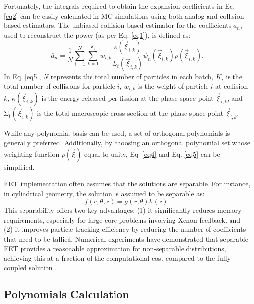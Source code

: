 Fortunately, the integrals required to obtain the expansion coefficients in Eq. \ref{eq2} can be easily calculated in MC simulations using both analog and collision-based estimators. The unbiased collision-based estimator for the coefficients ${\bar{a}}_n$, used to reconstruct the power (as per Eq. \ref{eq1}), is defined as:
\begin{equation}
    {\bar{a}}_n=\frac{1}{N}\sum_{i=1}^{N}{\sum_{k=1}^{K_i}{w_{i,k}\frac{\kappa\left({\vec{\xi}}_{i,k}\right)}{\Sigma_t\left({\vec{\xi}}_{i,k}\right)}}\psi_n\left({\vec{\xi}}_{i,k}\right)\rho\left({\vec{\xi}}_{i,k}\right)}.
    \label{eq5}
\end{equation}
In Eq. \ref{eq5}, $N$ represents the total number of particles in each batch, $K_i$ is the total number of collisions for particle $i$, $w_{i,k}$ is the weight of particle $i$ at collision $k$, $\kappa\left({\vec{\xi}}_{i,k}\right)$ is the energy released per fission at the phase space point ${\vec{\xi}}_{i,k}$, and $\mathrm{\Sigma}_\mathrm{t}\left({\vec{\xi}}_{i,k}\right)$ is the total macroscopic cross section at the phase space point ${\vec{\xi}}_{i,k}$.

While any polynomial basis can be used, a set of orthogonal polynomials is generally preferred. Additionally, by choosing an orthogonal polynomial set whose weighting function $\rho\left(\vec{\xi}\right)$ equal to unity, Eq. \ref{eq4} and Eq. \ref{eq5} can be simplified.

FET implementation often assumes that the solutions are separable. For instance, in cylindrical geometry, the solution is assumed to be separable as:
\begin{equation}
f\left(r,\theta,z\right)=g\left(r,\theta\right)h\left(z\right).
\end{equation}
This separability offers two key advantages: (1) it significantly reduces memory requirements, especially for large core problems involving Xenon feedback, and (2) it improves particle tracking efficiency by reducing the number of coefficients that need to be tallied. Numerical experiments have demonstrated that separable FET provides a reasonable approximation for non-separable distributions, achieving this at a fraction of the computational cost compared to the fully coupled solution \cite{gries}.

\subsection{Polynomials Calculation} \label{sec22}


